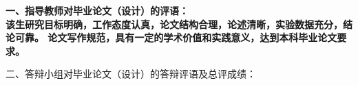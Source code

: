 \cleardoublepage{}

{
    \bfseries
    \noindent 一、指导教师对毕业论文（设计）的评语：\\
    该生研究目标明确，工作态度认真，论文结构合理，论述清晰，实验数据充分，结论可靠。
    论文写作规范，具有一定的学术价值和实践意义，达到本科毕业论文要求。

    \signature{指导教师（签名）}

    \noindent 二、答辩小组对毕业论文（设计）的答辩评语及总评成绩：\\

    \mbox{} \vfill

    \finaleval[][][][][]

    \signature{负责人（签名）}
}
